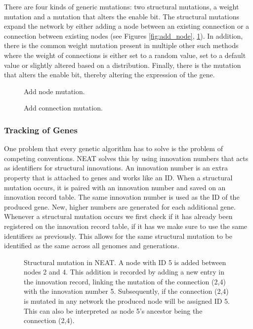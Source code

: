 \documentclass[letterpaper, 12pt]{article}
\begin{document}
There are four kinds of generic mutations: two structural mutations, a weight mutation
and a mutation that alters the enable bit. The structural mutations  expand the network
by either adding a node between an existing connection or a connection between existing
nodes (see Figures \ref{fig:add_node}, \ref{fig:add_con}). In addition, there is the
common weight mutation present in multiple other such methods where the weight of
connections is either set to a random value, set to a default value or slightly altered
based on a distribution. Finally, there is the mutation that alters the enable bit,
thereby altering the expression of the gene.

\begin{figure}[H]
  \centering
  
  \caption{Add node mutation.}
  \label{fig:add_node}
  \vspace{1cm}
  
  \caption{Add connection mutation.}
  \label{fig:add_con}
\end{figure}

\subsubsection*{Tracking of Genes}
One problem that every genetic algorithm has to solve is the problem of competing
conventions. NEAT solves this by using innovation numbers that acts as identifiers for
structural innovations. An innovation number is an extra property that is attached to
genes and works like an ID. When a structural mutation occurs, it is paired with an
innovation number and saved on an innovation record table. The same innovation number is
used as the ID of the produced gene. New, higher numbers are generated for each
additional gene. Whenever a structural mutation occurs we first check if it has already
been registered on the innovation record table, if it has we make sure to use the same
identifiers as previously. This allows for the same structural mutation to be identified
as the same across all genomes and generations.

\begin{figure}[H]
    \centering
    
    \caption{
      Structural mutation in NEAT. A node with ID 5 is added between nodes 2 and 4. This
      addition is recorded by adding a new entry in the innovation record, linking the
      mutation of the connection (2,4) with the innovation number 5. Subsequently, if
      the connection (2,4) is mutated in any network the produced node will be assigned
      ID 5. This can also be interpreted as node 5's ancestor being the connection
      (2,4).
    }
\end{figure}
\end{document}
